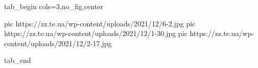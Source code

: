 
 
 
 
 


\ifcmt
  tab_begin cols=3,no_fig,center

     pic https://zz.te.ua/wp-content/uploads/2021/12/6-2.jpg
		 pic https://zz.te.ua/wp-content/uploads/2021/12/1-30.jpg
		 pic https://zz.te.ua/wp-content/uploads/2021/12/2-17.jpg

  tab_end
\fi
